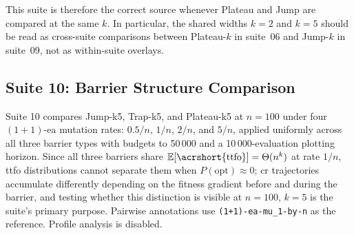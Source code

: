 This suite is therefore the correct source whenever Plateau and Jump are
compared at the same $k$. In particular, the shared widths $k=2$ and $k=5$
should be read as cross-suite comparisons between Plateau-$k$ in suite~06 and
Jump-$k$ in suite~09, not as within-suite overlays.

\subsection{Suite 10: Barrier Structure Comparison}



%
Suite 10 compares Jump-k5, Trap-k5, and Plateau-k5 at $n=100$ under four
$(1+1)$-\acrshort{ea} mutation rates: $0.5/n$, $1/n$, $2/n$, and $5/n$, applied
uniformly across all three barrier types with budgets to 50\,000 and a
10\,000-evaluation plotting horizon. Since all
three barriers share $\mathbb{E}[\text{\acrshort{ttfo}}] = \Theta(n^{k})$ at
rate $1/n$, \acrshort{ttfo} distributions cannot separate them when
$P(\text{opt}) \approx 0$; \acrshort{cr} trajectories accumulate
differently depending on the fitness gradient before and during the barrier, and
testing whether this distinction is visible at $n=100$, $k=5$ is the suite's
primary purpose. Pairwise annotations use
\texttt{(1+1)-\acrshort{ea}-mu\_1-by-n} as the reference. Profile analysis is
disabled.


